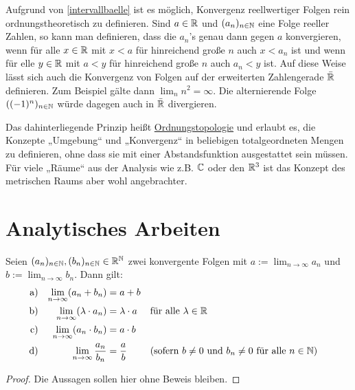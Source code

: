 \begin{vorschau}[* Ordnungstopologie]
    Aufgrund von \cref{intervallbaelle} ist es möglich, Konvergenz reellwertiger Folgen rein ordnungstheoretisch zu definieren. Sind $a\in \mathbb R$ und $(a_n)_{n\in \mathbb N}$ eine Folge reeller Zahlen, so kann man definieren, dass die $a_n$'s genau dann gegen $a$ konvergieren, wenn für alle $x\in \mathbb R$ mit $x<a$ für hinreichend große $n$ auch $x<a_n$ ist und wenn für elle $y\in \mathbb R$ mit $a<y$ für hinreichend große $n$ auch $a_n<y$ ist. Auf diese Weise lässt sich auch die Konvergenz von Folgen auf der erweiterten Zahlengerade $\bar {\mathbb R}$ definieren. Zum Beispiel gälte dann $\lim_n n^2=\infty$. Die alternierende Folge $((-1)^n)_{n\in \mathbb N}$ würde dagegen auch in $\bar{\mathbb R}$ divergieren.%
    
    Das dahinterliegende Prinzip heißt \href{https://de.wikipedia.org/wiki/Ordnungstopologie}{Ordnungstopologie} und erlaubt es, die Konzepte „Umgebung“ und „Konvergenz“ in beliebigen totalgeordneten Mengen zu definieren, ohne dass sie mit einer Abstandsfunktion ausgestattet sein müssen. Für viele „Räume“ aus der Analysis wie z.B. $\mathbb C$ oder den $\mathbb R^3$ ist das Konzept des metrischen Raums aber wohl angebrachter.
\end{vorschau}





\section{Analytisches Arbeiten}


\begin{satz} \label{konvergenzregeln}
    Seien $(a_n)_{n\in \mathbb N},(b_n)_{n\in \mathbb N}\in \mathbb R^\mathbb N$ zwei konvergente Folgen mit $a:=\lim_{n\to\infty}a_n$ und $b:=\lim_{n\to\infty}b_n$. Dann gilt:
    \begin{align*}
        \textnormal{a)} && \lim_{n\to\infty}(a_n+b_n) & = a+b \\
        \textnormal{b)} && \lim_{n\to\infty}(\lambda \cdot a_n) & = \lambda \cdot a && \textnormal{für alle}\ \lambda\in\mathbb R \\
        \textnormal{c)} && \lim_{n\to\infty}(a_n\cdot b_n) & = a\cdot b \\
        \textnormal{d)} && \lim_{n\to\infty}\frac{a_n}{b_n} & = \frac{a}{b} && (\textnormal{sofern $b\neq 0$ und $b_n\neq 0$ für alle $n\in \mathbb N$})
    \end{align*}
\end{satz}
\begin{proof}\let\qed\relax
    Die Aussagen sollen hier ohne Beweis bleiben.%
\end{proof}


